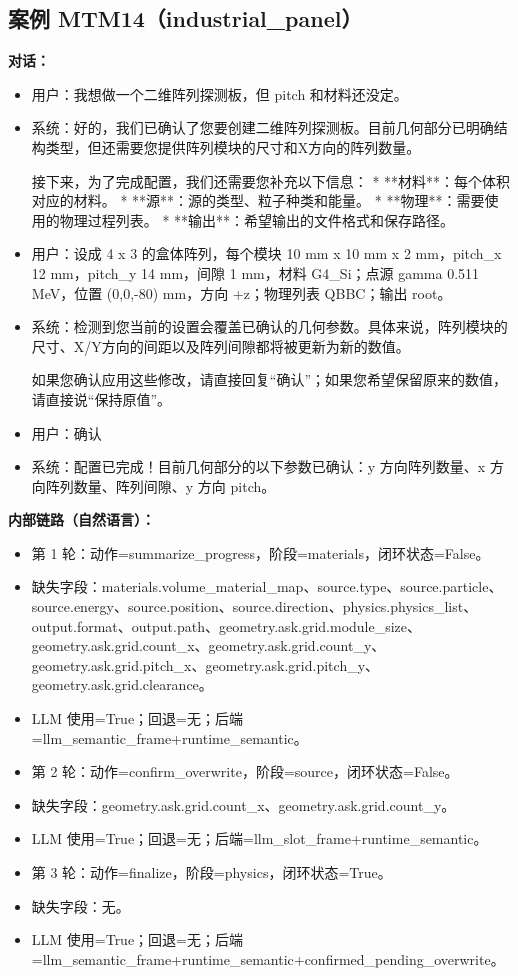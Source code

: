 \documentclass[11pt]{ctexart}
\begin{document}
\subsection{案例 MTM14（industrial\_panel）}
\textbf{对话：}
\begin{itemize}
\item 用户：我想做一个二维阵列探测板，但 pitch 和材料还没定。
\item 系统：好的，我们已确认了您要创建二维阵列探测板。目前几何部分已明确结构类型，但还需要您提供阵列模块的尺寸和X方向的阵列数量。

接下来，为了完成配置，我们还需要您补充以下信息：
*   **材料**：每个体积对应的材料。
*   **源**：源的类型、粒子种类和能量。
*   **物理**：需要使用的物理过程列表。
*   **输出**：希望输出的文件格式和保存路径。
\item 用户：设成 4 x 3 的盒体阵列，每个模块 10 mm x 10 mm x 2 mm，pitch\_x 12 mm，pitch\_y 14 mm，间隙 1 mm，材料 G4\_Si；点源 gamma 0.511 MeV，位置 (0,0,-80) mm，方向 +z；物理列表 QBBC；输出 root。
\item 系统：检测到您当前的设置会覆盖已确认的几何参数。具体来说，阵列模块的尺寸、X/Y方向的间距以及阵列间隙都将被更新为新的数值。

如果您确认应用这些修改，请直接回复“确认”；如果您希望保留原来的数值，请直接说“保持原值”。
\item 用户：确认
\item 系统：配置已完成！目前几何部分的以下参数已确认：y 方向阵列数量、x 方向阵列数量、阵列间隙、y 方向 pitch。
\end{itemize}
\textbf{内部链路（自然语言）：}
\begin{itemize}
\item 第 1 轮：动作=summarize\_progress，阶段=materials，闭环状态=False。
\item 缺失字段：materials.volume\_material\_map、source.type、source.particle、source.energy、source.position、source.direction、physics.physics\_list、output.format、output.path、geometry.ask.grid.module\_size、geometry.ask.grid.count\_x、geometry.ask.grid.count\_y、geometry.ask.grid.pitch\_x、geometry.ask.grid.pitch\_y、geometry.ask.grid.clearance。
\item LLM 使用=True；回退=无；后端=llm\_semantic\_frame+runtime\_semantic。
\item 第 2 轮：动作=confirm\_overwrite，阶段=source，闭环状态=False。
\item 缺失字段：geometry.ask.grid.count\_x、geometry.ask.grid.count\_y。
\item LLM 使用=True；回退=无；后端=llm\_slot\_frame+runtime\_semantic。
\item 第 3 轮：动作=finalize，阶段=physics，闭环状态=True。
\item 缺失字段：无。
\item LLM 使用=True；回退=无；后端=llm\_semantic\_frame+runtime\_semantic+confirmed\_pending\_overwrite。
\end{itemize}
\end{document}
